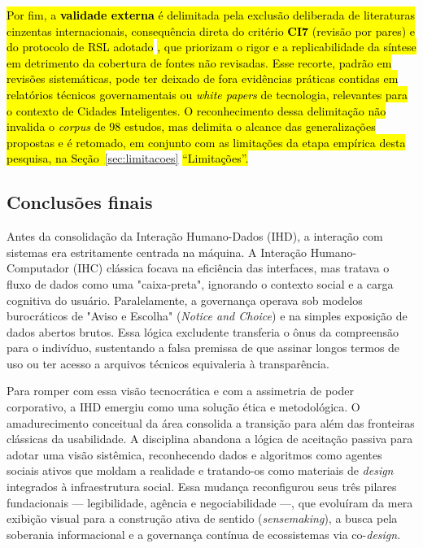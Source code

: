 \documentclass[
	12pt,				%
	oneside,			%
	a4paper,			%
	english,			%
	brazil				%
	]{abntex2ppgsi}
\begin{document}
    \hl{Por fim, a \textbf{validade externa} é delimitada pela exclusão deliberada de literaturas cinzentas internacionais, consequência direta do critério \textbf{CI7} (revisão por pares) e do protocolo de RSL adotado} \hl{, que priorizam o rigor e a replicabilidade da síntese em detrimento da cobertura de fontes não revisadas. Esse recorte, padrão em revisões sistemáticas, pode ter deixado de fora evidências práticas contidas em relatórios técnicos governamentais ou \textit{white papers} de tecnologia, relevantes para o contexto de Cidades Inteligentes. O reconhecimento dessa delimitação não invalida o \textit{corpus} de 98 estudos, mas delimita o alcance das generalizações propostas e é retomado, em conjunto com as limitações da etapa empírica desta pesquisa, na Seção~}\ref{sec:limitacoes}\hl{ ``Limitações''.}

    \subsection{Conclusões finais}\label{ConcluFinaisRSL}

    Antes da consolidação da Interação Humano-Dados (IHD), a interação com sistemas era estritamente centrada na máquina. A Interação Humano-Computador (IHC) clássica focava na eficiência das interfaces, mas tratava o fluxo de dados como uma "caixa-preta", ignorando o contexto social e a carga cognitiva do usuário. Paralelamente, a governança operava sob modelos burocráticos de "Aviso e Escolha" (\textit{Notice and Choice}) e na simples exposição de dados abertos brutos. Essa lógica excludente transferia o ônus da compreensão para o indivíduo, sustentando a falsa premissa de que assinar longos termos de uso ou ter acesso a arquivos técnicos equivaleria à transparência.

    Para romper com essa visão tecnocrática e com a assimetria de poder corporativo, a IHD emergiu como uma solução ética e metodológica. O amadurecimento conceitual da área consolida a transição para além das fronteiras clássicas da usabilidade. A disciplina abandona a lógica de aceitação passiva para adotar uma visão sistêmica, reconhecendo dados e algoritmos como agentes sociais ativos que moldam a realidade e tratando-os como materiais de \textit{design} integrados à infraestrutura social. Essa mudança reconfigurou seus três pilares fundacionais — legibilidade, agência e negociabilidade —, que evoluíram da mera exibição visual para a construção ativa de sentido (\textit{sensemaking}), a busca pela soberania informacional e a governança contínua de ecossistemas via co-\textit{design}.
\end{document}
